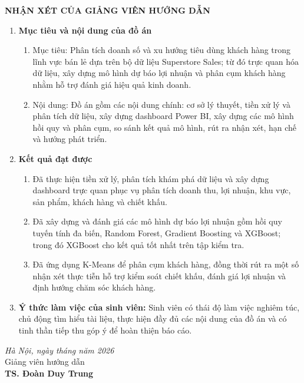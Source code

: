 \documentclass[oneside, a4paper]{book}
\theoremstyle{plain}
\theoremstyle{plain}
\theoremstyle{remark}
\theoremstyle{definition}
\theoremstyle{remark}
\begin{document}
	\newpage
	
	\newpage
	\thisfancypage{
		\setlength{\fboxsep}{0.5cm}
		\fbox}{}
	\thispagestyle{empty}
	\fontsize{13pt}{16pt}\selectfont
	\bigbreak
	\begin{center}
		{\bfseries NHẬN XÉT CỦA GIẢNG VIÊN HƯỚNG DẪN}
	\end{center}
	\bigbreak
	
	\fontsize{12pt}{14pt}\selectfont
	\begin{enumerate}
		\item [{\bfseries 1.}]{\bfseries Mục tiêu và nội dung của đồ án}
		\begin{enumerate}
			\item Mục tiêu: Phân tích doanh số và xu hướng tiêu dùng khách hàng trong lĩnh vực bán lẻ dựa trên bộ dữ liệu Superstore Sales; từ đó trực quan hóa dữ liệu, xây dựng mô hình dự báo lợi nhuận và phân cụm khách hàng nhằm hỗ trợ đánh giá hiệu quả kinh doanh.
			\item Nội dung: Đồ án gồm các nội dung chính: cơ sở lý thuyết, tiền xử lý và phân tích dữ liệu, xây dựng dashboard Power BI, xây dựng các mô hình hồi quy và phân cụm, so sánh kết quả mô hình, rút ra nhận xét, hạn chế và hướng phát triển. 
		\end{enumerate}
		\item [{\bfseries 2.}] {\bfseries Kết quả đạt được} 
		\begin{enumerate}
			\item Đã thực hiện tiền xử lý, phân tích khám phá dữ liệu và xây dựng dashboard trực quan phục vụ phân tích doanh thu, lợi nhuận, khu vực, sản phẩm, khách hàng và chiết khấu.
			\item Đã xây dựng và đánh giá các mô hình dự báo lợi nhuận gồm hồi quy tuyến tính đa biến, Random Forest, Gradient Boosting và XGBoost; trong đó XGBoost cho kết quả tốt nhất trên tập kiểm tra.
			\item Đã ứng dụng K-Means để phân cụm khách hàng, đồng thời rút ra một số nhận xét thực tiễn hỗ trợ kiểm soát chiết khấu, đánh giá lợi nhuận và định hướng chăm sóc khách hàng.
		\end{enumerate}
		\item [{\bfseries 3.}]{\bfseries Ý thức làm việc của sinh viên:} Sinh viên có thái độ làm việc nghiêm túc, chủ động tìm hiểu tài liệu, thực hiện đầy đủ các nội dung của đồ án và có tinh thần tiếp thu góp ý để hoàn thiện báo cáo.
	\end{enumerate}
	\hspace{0.5\textwidth}
	\begin{minipage}{0.5\textwidth}
		\noindent\begin{center}
			\textit{Hà Nội, ngày     tháng  năm 2026} \\
			Giảng viên hướng dẫn\\ \vspace{2cm}
			\textbf{TS. Đoàn Duy Trung}
		\end{center}	
	\end{minipage}
	
\end{document}
